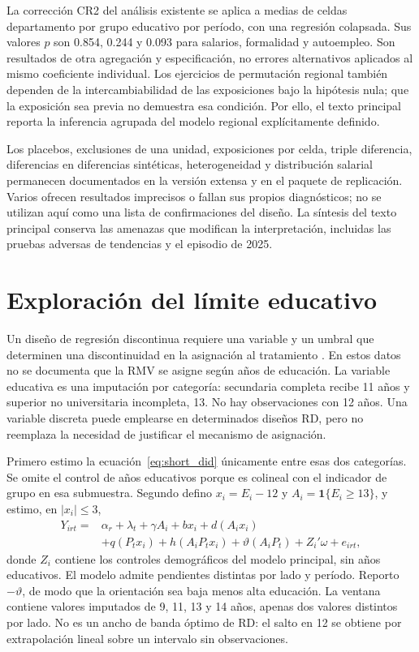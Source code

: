 La corrección CR2 del análisis existente se aplica a medias de celdas departamento por grupo educativo por período, con una regresión colapsada. Sus valores $p$ son 0.854, 0.244 y 0.093 para salarios, formalidad y autoempleo. Son resultados de otra agregación y especificación, no errores alternativos aplicados al mismo coeficiente individual. Los ejercicios de permutación regional también dependen de la intercambiabilidad de las exposiciones bajo la hipótesis nula; que la exposición sea previa no demuestra esa condición. Por ello, el texto principal reporta la inferencia agrupada del modelo regional explícitamente definido.

Los placebos, exclusiones de una unidad, exposiciones por celda, triple diferencia, diferencias en diferencias sintéticas, heterogeneidad y distribución salarial permanecen documentados en la versión extensa y en el paquete de replicación. Varios ofrecen resultados imprecisos o fallan sus propios diagnósticos; no se utilizan aquí como una lista de confirmaciones del diseño. La síntesis del texto principal conserva las amenazas que modifican la interpretación, incluidas las pruebas adversas de tendencias y el episodio de 2025.
\FloatBarrier

\section{Exploración del límite educativo}
\label{app:short_local}

Un diseño de regresión discontinua requiere una variable y un umbral que determinen una discontinuidad en la asignación al tratamiento \citep{cattaneo_titiunik_2022_short}. En estos datos no se documenta que la RMV se asigne según años de educación. La variable educativa es una imputación por categoría: secundaria completa recibe 11 años y superior no universitaria incompleta, 13. No hay observaciones con 12 años. Una variable discreta puede emplearse en determinados diseños RD, pero no reemplaza la necesidad de justificar el mecanismo de asignación.

Primero estimo la ecuación~\eqref{eq:short_did} únicamente entre esas dos categorías. Se omite el control de años educativos porque es colineal con el indicador de grupo en esa submuestra. Segundo defino $x_i=E_i-12$ y $A_i=\mathbf{1}\{E_i\ge13\}$, y estimo, en $|x_i|\le3$,
\begin{equation}
\begin{split}
Y_{irt}={}&\alpha_r+\lambda_t+\gamma A_i+b x_i+d(A_ix_i)\\
&+q(P_tx_i)+h(A_iP_tx_i)+\vartheta(A_iP_t)+Z_i'\omega+e_{irt},
\end{split}
\label{eq:short_jump}
\end{equation}
donde $Z_i$ contiene los controles demográficos del modelo principal, sin años educativos. El modelo admite pendientes distintas por lado y período. Reporto $-\vartheta$, de modo que la orientación sea baja menos alta educación. La ventana contiene valores imputados de 9, 11, 13 y 14 años, apenas dos valores distintos por lado. No es un ancho de banda óptimo de RD: el salto en 12 se obtiene por extrapolación lineal sobre un intervalo sin observaciones.

